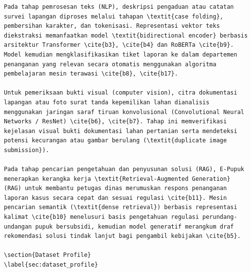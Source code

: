 \documentclass[conference]{IEEEtran}
\begin{document}
\begin{lstlisting}
Pada tahap pemrosesan teks (NLP), deskripsi pengaduan atau catatan survei lapangan diproses melalui tahapan \textit{case folding}, pembersihan karakter, dan tokenisasi. Representasi vektor teks diekstraksi memanfaatkan model \textit{bidirectional encoder} berbasis arsitektur Transformer \cite{b3}, \cite{b4} dan RoBERTa \cite{b9}. Model kemudian mengklasifikasikan tiket laporan ke dalam departemen penanganan yang relevan secara otomatis menggunakan algoritma pembelajaran mesin terawasi \cite{b8}, \cite{b17}.

Untuk pemeriksaan bukti visual (computer vision), citra dokumentasi lapangan atau foto surat tanda kepemilikan lahan dianalisis menggunakan jaringan saraf tiruan konvolusional (Convolutional Neural Networks / ResNet) \cite{b6}, \cite{b7}. Tahap ini memverifikasi kejelasan visual bukti dokumentasi lahan pertanian serta mendeteksi potensi kecurangan atau gambar berulang (\textit{duplicate image submission}).

Pada tahap pencarian pengetahuan dan penyusunan solusi (RAG), E-Pupuk menerapkan kerangka kerja \textit{Retrieval-Augmented Generation} (RAG) untuk membantu petugas dinas merumuskan respons penanganan laporan kasus secara cepat dan sesuai regulasi \cite{b11}. Mesin pencarian semantik (\textit{dense retrieval}) berbasis representasi kalimat \cite{b10} menelusuri basis pengetahuan regulasi perundang-undangan pupuk bersubsidi, kemudian model generatif merangkum draf rekomendasi solusi tindak lanjut bagi pengambil kebijakan \cite{b5}.

\section{Dataset Profile}
\label{sec:dataset_profile}


\end{lstlisting}
\end{document}

